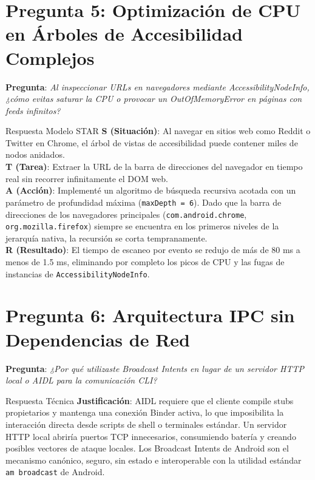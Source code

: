 \documentclass[11pt,a4paper,oneside]{report}
\begin{document}
\section{Pregunta 5: Optimización de CPU en Árboles de Accesibilidad Complejos}
\textbf{Pregunta}: \textit{Al inspeccionar URLs en navegadores mediante AccessibilityNodeInfo, ¿cómo evitas saturar la CPU o provocar un OutOfMemoryError en páginas con feeds infinitos?}

\begin{starbox}{Respuesta Modelo STAR}
\textbf{\color{starSituation}S (Situación)}: Al navegar en sitios web como Reddit o Twitter en Chrome, el árbol de vistas de accesibilidad puede contener miles de nodos anidados.\\[0.15cm]
\textbf{\color{starTask}T (Tarea)}: Extraer la URL de la barra de direcciones del navegador en tiempo real sin recorrer infinitamente el DOM web.\\[0.15cm]
\textbf{\color{starAction}A (Acción)}: Implementé un algoritmo de búsqueda recursiva acotada con un parámetro de profundidad máxima (\texttt{maxDepth = 6}). Dado que la barra de direcciones de los navegadores principales (\texttt{com.android.chrome}, \texttt{org.mozilla.firefox}) siempre se encuentra en los primeros niveles de la jerarquía nativa, la recursión se corta tempranamente.\\[0.15cm]
\textbf{\color{starResult}R (Resultado)}: El tiempo de escaneo por evento se redujo de más de 80 ms a menos de 1.5 ms, eliminando por completo los picos de CPU y las fugas de instancias de \texttt{AccessibilityNodeInfo}.
\end{starbox}

\newpage

\section{Pregunta 6: Arquitectura IPC sin Dependencias de Red}
\textbf{Pregunta}: \textit{¿Por qué utilizaste Broadcast Intents en lugar de un servidor HTTP local o AIDL para la comunicación CLI?}
\begin{starbox}{Respuesta Técnica}
\textbf{Justificación}: AIDL requiere que el cliente compile stubs propietarios y mantenga una conexión Binder activa, lo que imposibilita la interacción directa desde scripts de shell o terminales estándar. Un servidor HTTP local abriría puertos TCP innecesarios, consumiendo batería y creando posibles vectores de ataque locales. Los Broadcast Intents de Android son el mecanismo canónico, seguro, sin estado e interoperable con la utilidad estándar \texttt{am broadcast} de Android.
\end{starbox}
\end{document}
